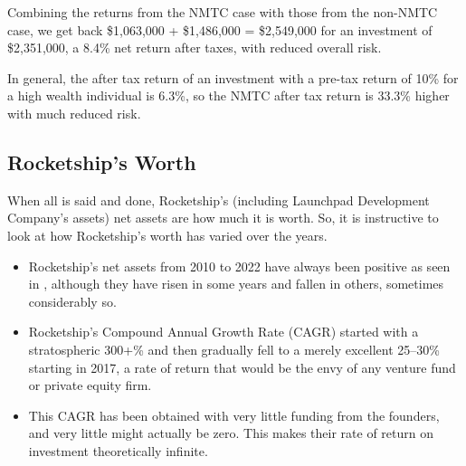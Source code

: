 Combining the returns from the NMTC case with those from the non-NMTC case, we get back \$1,063,000 + \$1,486,000 = \$2,549,000 for an investment of \$2,351,000, a 8.4\% net return after taxes, with reduced overall risk.
  
  In general, the after tax return of an investment with a pre-tax return of 10\% for a high wealth individual is 6.3\%, so the NMTC after tax return is 33.3\% higher with much reduced risk.


\subsection{Rocketship's Worth}%
\label{sec:rocketship-worth}\indent%

When all is said and done, Rocketship's (including Launchpad Development Company's assets) net assets are how much it is worth. So, it is instructive to look at how Rocketship's worth has varied over the years.
\begin{itemize}
  \item Rocketship's net assets from 2010 to 2022 have always been positive as seen in , although they have risen in some years and fallen in others, sometimes considerably so.
  \item Rocketship's Compound Annual Growth Rate (CAGR) started with a stratospheric 300+\% and then gradually fell to a merely excellent 25–30\% starting in 2017, a rate of return that would be the envy of any venture fund or private equity firm.
 \item This CAGR has been obtained with very little funding from the founders, and very little might actually be zero. This makes their rate of return on investment theoretically infinite.
\end{itemize}


